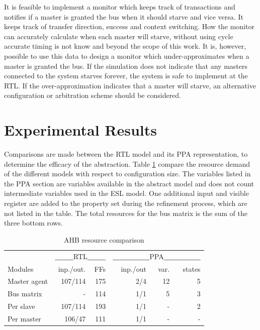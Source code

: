 It is feasible to implement a monitor which keeps track of transactions and notifies if a master is granted the bus when it should starve and vice versa. It keeps track of transfer direction, success and context switching. How the monitor can accurately calculate when each master will starve, without using cycle accurate timing is not know and beyond the scope of this work. It is, however, possible to use this data to design a monitor which under-approximates when a master is granted the bus. If the simulation does not indicate that any masters connected to the system starves forever, the system is safe to implement at the RTL. If the over-approximation indicates that a master will starve, an alternative configuration or arbitration scheme should be considered. 




\section{Experimental Results}

Comparisons are made between the RTL model and its PPA representation, to determine the efficacy of the abstraction. Table \ref{tab:stats} compare the resource demand of the different models with respect to configuration size. The variables listed in the PPA section are variables available in the abstract model and does not count intermediate variables used in the ESL model. One additional input and visible register are added to the property set during the refinement process, which are not listed in the table. The total resources for the bus matrix is the sum of the three bottom rows.

\begin{table}[hbt] 
  \begin{tabular}{ l r r r r r}
  \hline 
  \hline
      & \multicolumn{2}{c}{\textbf{\_\_\_}RTL\textbf{\_\_\_}} & \multicolumn{3}{c}{\textbf{\_\_\_\_\_\_}PPA\textbf{\_\_\_\_\_\_}} \\
  Modules & inp./out. & FFs & inp./out & var. & states \\
    \hline
  Master agent & 107/114 & 175 & 2/4 & 12 & 5 \\
  \hline
  Bus matrix & - & 114 & 1/1 & 5 & 3 \\
  
  Per slave & 107/114 & 193 & 1/1 & - & 2 \\
 
  Per master & 106/47 & 111 & 1/1 & - & - \\
    \hline
    \hline  
  \end{tabular}
\caption{AHB resource comparison}
\label{tab:stats}
\end{table}

